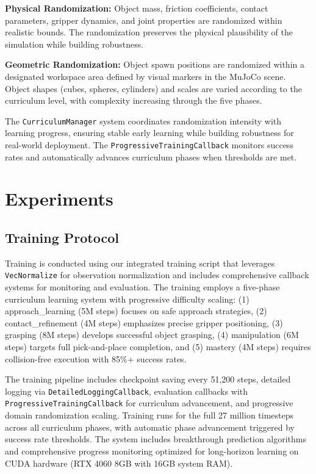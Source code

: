 \documentclass[conference]{IEEEtran}
\begin{document}
\textbf{Physical Randomization:} Object mass, friction coefficients, contact parameters, gripper dynamics, and joint properties are randomized within realistic bounds. The randomization preserves the physical plausibility of the simulation while building robustness.

\textbf{Geometric Randomization:} Object spawn positions are randomized within a designated workspace area defined by visual markers in the MuJoCo scene. Object shapes (cubes, spheres, cylinders) and scales are varied according to the curriculum level, with complexity increasing through the five phases.

The \texttt{CurriculumManager} system coordinates randomization intensity with learning progress, ensuring stable early learning while building robustness for real-world deployment. The \texttt{ProgressiveTrainingCallback} monitors success rates and automatically advances curriculum phases when thresholds are met.

\section{Experiments}

\subsection{Training Protocol}
Training is conducted using our integrated training script that leverages \texttt{VecNormalize} for observation normalization and includes comprehensive callback systems for monitoring and evaluation. The training employs a five-phase curriculum learning system with progressive difficulty scaling: (1) approach\_learning (5M steps) focuses on safe approach strategies, (2) contact\_refinement (4M steps) emphasizes precise gripper positioning, (3) grasping (8M steps) develops successful object grasping, (4) manipulation (6M steps) targets full pick-and-place completion, and (5) mastery (4M steps) requires collision-free execution with 85\%+ success rates.

The training pipeline includes checkpoint saving every 51,200 steps, detailed logging via \texttt{DetailedLoggingCallback}, evaluation callbacks with \texttt{ProgressiveTrainingCallback} for curriculum advancement, and progressive domain randomization scaling. Training runs for the full 27 million timesteps across all curriculum phases, with automatic phase advancement triggered by success rate thresholds. The system includes breakthrough prediction algorithms and comprehensive progress monitoring optimized for long-horizon learning on CUDA hardware (RTX 4060 8GB with 16GB system RAM).
\end{document}
